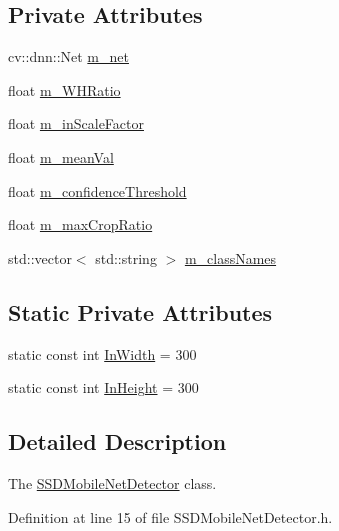 \subsection*{Private Attributes}
\begin{DoxyCompactItemize}
\item 
cv\+::dnn\+::\+Net \mbox{\hyperlink{class_s_s_d_mobile_net_detector_a49cee71e617fd5999e73fbaba9859a71}{m\+\_\+net}}
\item 
float \mbox{\hyperlink{class_s_s_d_mobile_net_detector_ac4f9e209a12a97a3a8696f1df0d1f046}{m\+\_\+\+W\+H\+Ratio}}
\item 
float \mbox{\hyperlink{class_s_s_d_mobile_net_detector_a669234ba12981608ce794634abe2a361}{m\+\_\+in\+Scale\+Factor}}
\item 
float \mbox{\hyperlink{class_s_s_d_mobile_net_detector_a5fda467ac26a8688339d31b14e7e9e20}{m\+\_\+mean\+Val}}
\item 
float \mbox{\hyperlink{class_s_s_d_mobile_net_detector_ae854ddcece46a348d20debc470882b3b}{m\+\_\+confidence\+Threshold}}
\item 
float \mbox{\hyperlink{class_s_s_d_mobile_net_detector_a5fb35dca36d36fb75c65d1846fe65233}{m\+\_\+max\+Crop\+Ratio}}
\item 
std\+::vector$<$ std\+::string $>$ \mbox{\hyperlink{class_s_s_d_mobile_net_detector_a717ffc431ea4fd25cbc6cb1172cbd7e6}{m\+\_\+class\+Names}}
\end{DoxyCompactItemize}
\subsection*{Static Private Attributes}
\begin{DoxyCompactItemize}
\item 
static const int \mbox{\hyperlink{class_s_s_d_mobile_net_detector_ac77d00e649eb5c0ddbd12229416e98c5}{In\+Width}} = 300
\item 
static const int \mbox{\hyperlink{class_s_s_d_mobile_net_detector_afc45ce0049d048598325eda63f10056f}{In\+Height}} = 300
\end{DoxyCompactItemize}


\subsection{Detailed Description}
The \mbox{\hyperlink{class_s_s_d_mobile_net_detector}{S\+S\+D\+Mobile\+Net\+Detector}} class. 

Definition at line 15 of file S\+S\+D\+Mobile\+Net\+Detector.\+h.



